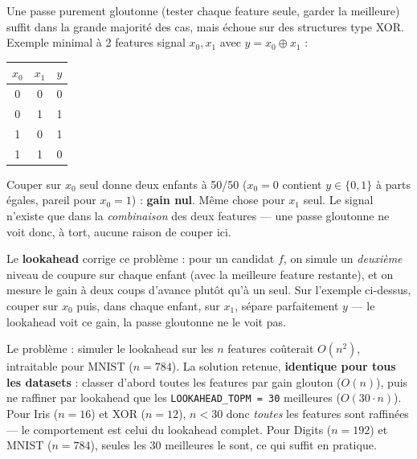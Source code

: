 \documentclass[12pt,a4paper]{article}
\newcommand{\code}[1]{\texttt{#1}}
\theoremstyle{remark}
\begin{document}
Une passe purement gloutonne (tester chaque feature seule, garder la meilleure)
suffit dans la grande majorité des cas, mais échoue sur des structures type XOR.
Exemple minimal à 2 features signal $x_0,x_1$ avec $y = x_0 \oplus x_1$ :

\begin{center}
\begin{tabular}{ccc}
\toprule
$x_0$ & $x_1$ & $y$ \\
\midrule
0 & 0 & 0 \\
0 & 1 & 1 \\
1 & 0 & 1 \\
1 & 1 & 0 \\
\bottomrule
\end{tabular}
\end{center}

\noindent Couper sur $x_0$ seul donne deux enfants à 50/50 ($x_0{=}0$ contient
$y{\in}\{0,1\}$ à parts égales, pareil pour $x_0{=}1$) : \textbf{gain nul}. Même
chose pour $x_1$ seul. Le signal n'existe que dans la \emph{combinaison} des deux
features --- une passe gloutonne ne voit donc, à tort, aucune raison de couper ici.

Le \textbf{lookahead} corrige ce problème : pour un candidat $f$, on simule un
\emph{deuxième} niveau de coupure sur chaque enfant (avec la meilleure feature
restante), et on mesure le gain à deux coups d'avance plutôt qu'à un seul. Sur
l'exemple ci-dessus, couper sur $x_0$ puis, dans chaque enfant, sur $x_1$, sépare
parfaitement $y$ --- le lookahead voit ce gain, la passe gloutonne ne le voit pas.

Le problème : simuler le lookahead sur les $n$ features coûterait $O(n^2)$,
intraitable pour MNIST ($n=784$). La solution retenue, \textbf{identique pour
tous les datasets} : classer d'abord toutes les features par gain glouton
($O(n)$), puis ne raffiner par lookahead que les \code{LOOKAHEAD\_TOPM = 30}
meilleures ($O(30\cdot n)$). Pour Iris ($n{=}16$) et XOR ($n{=}12$), $n<30$ donc
\emph{toutes} les features sont raffinées --- le comportement est celui du
lookahead complet. Pour Digits ($n{=}192$) et MNIST ($n{=}784$), seules les 30
meilleures le sont, ce qui suffit en pratique.
\end{document}
